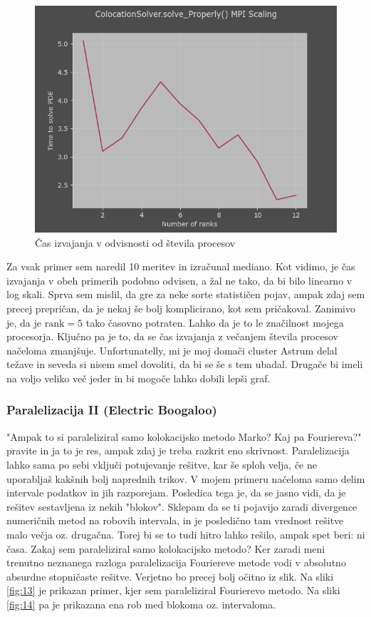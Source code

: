 \documentclass[a4paper]{article}
\begin{document}
\begin{figure}[H]
    \centering
        \includegraphics[width=\linewidth]{./images/C_Proper_MPI_scaling.png}
        \caption{Čas izvajanja v odvisnosti od števila procesov}
\label{fig:12}
\end{figure}

Za vsak primer sem naredil 10 meritev in izračunal mediano. Kot vidimo, je čas izvajanja v obeh primerih
podobno odvisen, a žal ne tako, da bi bilo linearno v log skali. Sprva sem mislil, da gre za neke sorte 
statističen pojav, ampak zdaj sem precej prepričan, da je nekaj še bolj komplicirano, kot sem pričakoval.
Zanimivo je, da je $\mathrm{rank}=5$ tako časovno potraten. Lahko da je to le značilnost mojega procesorja.
Ključno pa je to, da se čas izvajanja z večanjem števila procesov načeloma zmanjšuje. Unfortunatelly, mi je
moj domači cluster Astrum delal težave in seveda si nisem smel dovoliti, da bi se še s tem ubadal. Drugače bi
imeli na voljo veliko več jeder in bi mogoče lahko dobili lepši graf.\\

\subsubsection{Paralelizacija II (Electric Boogaloo)}
"Ampak to si paraleliziral samo kolokacijsko metodo Marko? Kaj pa Fouriereva?" pravite in ja to je res, ampak
zdaj je treba razkrit eno skrivnost. Paralelizacija lahko sama po sebi vključi potujevanje rešitve, kar še 
sploh velja, če ne uporabljaš kakšnih bolj naprednih trikov. V mojem primeru načeloma samo delim intervale 
podatkov in jih razporejam. Posledica tega je, da se jasno vidi, da je rešitev sestavljena iz nekih "blokov".
Sklepam da se ti pojavijo zaradi divergence numeričnih metod na robovih intervala, in je posledično tam vrednost
rešitve malo večja oz. drugačna. Torej bi se to tudi hitro lahko rešilo, ampak spet beri: ni časa. Zakaj sem 
paraleliziral samo kolokacijsko metodo? Ker zaradi meni trenutno neznanega razloga paralelizacija Fouriereve
metode vodi v absolutno absurdne stopničaste rešitve. Verjetno bo precej bolj očitno iz slik. Na sliki \ref{fig:13}
je prikazan primer, kjer sem paraleliziral Fourierevo metodo. Na sliki \ref{fig:14} pa je prikazana ena rob med 
blokoma oz. intervaloma.
\end{document}
